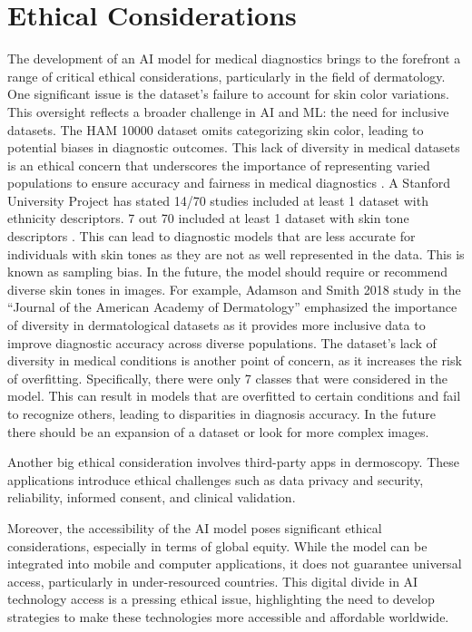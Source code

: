 \documentclass[10pt,twocolumn]{article}
\begin{document}
\section{Ethical Considerations}
The development of an AI model for medical diagnostics brings to the forefront a range of critical ethical considerations, particularly in the field of dermatology. One significant issue is the dataset’s failure to account for skin color variations. This oversight reflects a broader challenge in AI and ML: the need for inclusive datasets. The HAM 10000 dataset omits categorizing skin color, leading to potential biases in diagnostic outcomes. This lack of diversity in medical datasets is an ethical concern that underscores the importance of representing varied populations to ensure accuracy and fairness in medical diagnostics \cite{E;}. A Stanford University Project has stated 14/70 studies included at least 1 dataset with ethnicity descriptors. 7 out 70 included at least 1 dataset with skin tone descriptors \cite{Diverse}. This can lead to diagnostic models that are less accurate for individuals with skin tones as they are not as well represented in the data. This is known as sampling bias. In the future, the model should require or recommend diverse skin tones in images. For example, Adamson and Smith 2018 study in the “Journal of the American Academy of Dermatology” emphasized the importance of diversity in dermatological datasets as it provides more inclusive data to improve diagnostic accuracy across diverse populations. The dataset's lack of diversity in medical conditions is another point of concern, as it increases the risk of overfitting. Specifically, there were only 7 classes that were considered in the model. This can result in models that are overfitted to certain conditions and fail to recognize others, leading to disparities in diagnosis accuracy. In the future there should be an expansion of a dataset or look for more complex images. \newline \newline

Another big ethical consideration involves third-party apps in dermoscopy. These applications introduce ethical challenges such as data privacy and security, reliability, informed consent, and clinical validation. \newline

Moreover, the accessibility of the AI model poses significant ethical considerations, especially in terms of global equity. While the model can be integrated into mobile and computer applications, it does not guarantee universal access, particularly in under-resourced countries. This digital divide in AI technology access is a pressing ethical issue, highlighting the need to develop strategies to make these technologies more accessible and affordable worldwide. \newline
\end{document}
